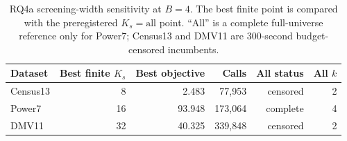 \begin{table}[t]
\centering
\scriptsize
\setlength{\tabcolsep}{2pt}
\caption{RQ4a screening-width sensitivity at $B=4$. The best finite point
is compared with the preregistered $K_s=\mathrm{all}$ point. ``All'' is a
complete full-universe reference only for Power7; Census13 and DMV11 are
300-second budget-censored incumbents.}
\label{tab:rq4-ks-sensitivity}
\begin{tabular}{lrrrrr}
\toprule
Dataset & Best finite $K_s$ & Best objective & Calls & All status & All $k$ \\
\midrule
Census13 & 8 & 2.483 & 77,953 & censored & 2 \\
Power7 & 16 & 93.948 & 173,064 & complete & 4 \\
DMV11 & 32 & 40.325 & 339,848 & censored & 2 \\
\bottomrule
\end{tabular}
\end{table}
